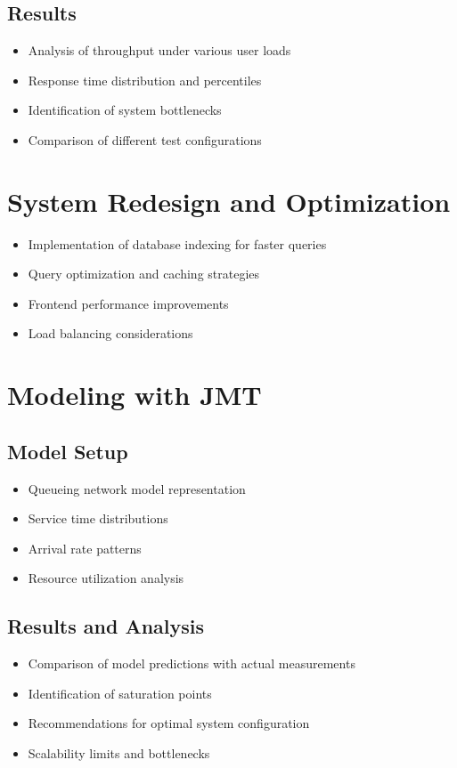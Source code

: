 \documentclass[12pt]{article}
\begin{document}
\subsection{Results}
\begin{itemize}
    \item Analysis of throughput under various user loads
    \item Response time distribution and percentiles
    \item Identification of system bottlenecks
    \item Comparison of different test configurations
\end{itemize}

\section{System Redesign and Optimization}
\begin{itemize}
    \item Implementation of database indexing for faster queries
    \item Query optimization and caching strategies
    \item Frontend performance improvements
    \item Load balancing considerations
\end{itemize}

\section{Modeling with JMT}
\subsection{Model Setup}
\begin{itemize}
    \item Queueing network model representation
    \item Service time distributions
    \item Arrival rate patterns
    \item Resource utilization analysis
\end{itemize}

\subsection{Results and Analysis}
\begin{itemize}
    \item Comparison of model predictions with actual measurements
    \item Identification of saturation points
    \item Recommendations for optimal system configuration
    \item Scalability limits and bottlenecks
\end{itemize}
\end{document}
